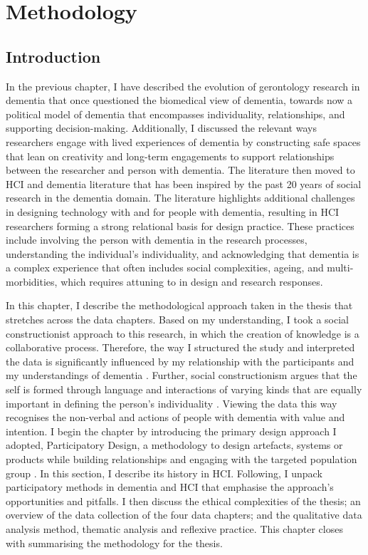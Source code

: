 \chapter{Methodology}
\label{Methodology}

\section{Introduction}
\label{Method:Intro}

In the previous chapter, I have described the evolution of gerontology research in dementia that once questioned the biomedical view of dementia, towards now a political model of dementia that encompasses individuality, relationships, and supporting decision-making. Additionally, I discussed the relevant ways researchers engage with lived experiences of dementia by constructing safe spaces that lean on creativity and long-term engagements to support relationships between the researcher and person with dementia. The literature then moved to HCI and dementia literature that has been inspired by the past 20 years of social research in the dementia domain. The literature highlights additional challenges in designing technology with and for people with dementia, resulting in HCI researchers forming a strong relational basis for design practice. These practices include involving the person with dementia in the research processes, understanding the individual's individuality, and acknowledging that dementia is a complex experience that often includes social complexities, ageing, and multi-morbidities, which requires attuning to in design and research responses. 

In this chapter, I describe the methodological approach taken in the thesis that stretches across the data chapters. Based on my understanding, I took a social constructionist approach to this research, in which the creation of knowledge is a collaborative process. Therefore, the way I structured the study and interpreted the data is significantly influenced by my relationship with the participants and my understandings of dementia \citep{surr2006preservation}. Further, social constructionism argues that the self is formed through language and interactions of varying kinds that are equally important in defining the person's individuality \citep{sarup1996identity}. Viewing the data this way recognises the non-verbal and actions of people with dementia with value and intention. I begin the chapter by introducing the primary design approach I adopted, Participatory Design, a methodology to design artefacts, systems or products while building relationships and engaging with the targeted population group \citep{duarte2018participatory}. In this section, I describe its history in HCI. Following, I unpack participatory methods in dementia and HCI that emphasise the approach's opportunities and pitfalls. I then discuss the ethical complexities of the thesis; an overview of the data collection of the four data chapters; and the qualitative data analysis method, thematic analysis and reflexive practice. This chapter closes with summarising the methodology for the thesis.  

